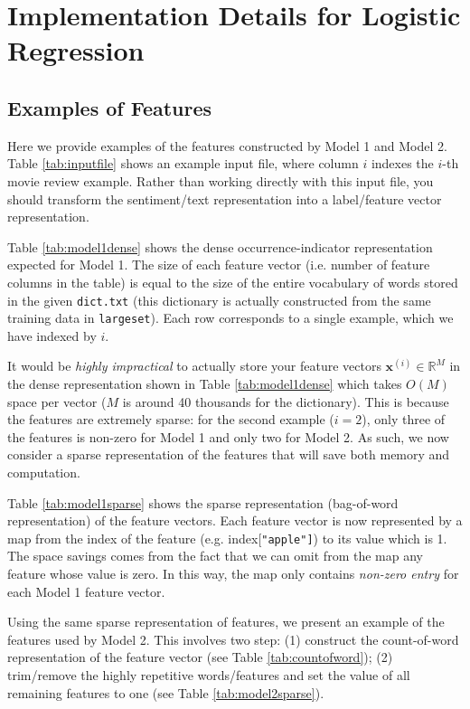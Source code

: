 \documentclass[11pt,addpoints,answers]{exam}
\newcommand{\Rb}{\mathbb{R}}
\newcommand{\xv}{\mathbf{x}}
\begin{document}
\newpage

\appendix


\section{Implementation Details for Logistic Regression}

\subsection{Examples of Features}

Here we provide examples of the features constructed by Model 1 and Model 2. Table \ref{tab:inputfile} shows an example input file, where column $i$  indexes the $i$-th movie review example. Rather than working directly with this input file, you should transform the sentiment/text representation into a label/feature vector representation.

Table \ref{tab:model1dense} shows the dense occurrence-indicator representation expected for Model 1. The size of each feature vector (i.e. number of feature columns in the table) is equal to the size of the entire vocabulary of words stored in the given \lstinline{dict.txt} (this dictionary is actually constructed from the same training data in \lstinline{largeset}). Each row corresponds to a single example, which we have indexed by $i$.

It would be \emph{highly impractical} to actually store your feature vectors $\xv^{(i)} \in \Rb^M$ in the dense representation shown in Table \ref{tab:model1dense} which takes $O(M)$ space per vector ($M$ is around 40 thousands for the dictionary). This is because the features are extremely sparse: for the second example ($i=2$), only three of the features is non-zero for Model 1 and only two for Model 2. As such, we now consider a sparse representation of the features that will save both memory and computation.

Table \ref{tab:model1sparse} shows the sparse representation (bag-of-word representation) of the feature vectors. Each feature vector is now represented by a map from the index of the feature (e.g. {index[\tt "apple"]}) to its value which is 1. The space savings comes from the fact that we can omit from the map any feature whose value is zero. In this way, the map only contains \emph{non-zero entry} for each Model 1 feature vector.

Using the same sparse representation of features, we present an example of the features used by Model 2. This involves two step: (1) construct the count-of-word representation of the feature vector (see Table \ref{tab:countofword}); (2) trim/remove the highly repetitive words/features  and set the value of all remaining features to one (see Table \ref{tab:model2sparse}).
\end{document}
